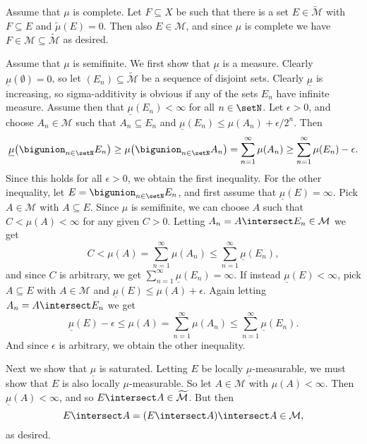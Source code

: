 \documentclass[article, a4paper, 11pt, oneside]{memoir}
\numberwithin{equation}{chapter}
\newcommand{\calM}{\mathcal{M}}
\begin{document}
\begin{solution}
	\item Assume that $\mu$ is complete. Let $F \subseteq X$ be such that there is a set $E \in \widetilde{\calM}$ with $F \subseteq E$ and $\tilde\mu(E) = 0$. Then also $E \in \calM$, and since $\mu$ is complete we have $F \in \calM \subseteq \widetilde{\calM}$ as desired.

	\item Assume that $\mu$ is semifinite. We first show that $\underline\mu$ is a measure. Clearly $\underline\mu(\emptyset) = 0$, so let $(E_n) \subseteq \widetilde{\calM}$ be a sequence of disjoint sets. Clearly $\underline\mu$ is increasing, so sigma-additivity is obvious if any of the sets $E_n$ have infinite measure. Assume then that $\underline\mu(E_n) < \infty$ for all $n \in \setN$. Let $\epsilon > 0$, and choose $A_n \in \calM$ such that $A_n \subseteq E_n$ and $\underline\mu(E_n) \leq \mu(A_n) + \epsilon/2^n$. Then
	\begin{equation*}
		\underline\mu \bigl( \bigunion_{n \in \setN} E_n \bigr)
			\geq \mu \bigl( \bigunion_{n \in \setN} A_n \bigr)
			= \sum_{n=1}^\infty \mu(A_n)
			\geq \sum_{n=1}^\infty \mu(E_n) - \epsilon.
	\end{equation*}
	Since this holds for all $\epsilon > 0$, we obtain the first inequality. For the other inequality, let $E = \bigunion_{n \in \setN} E_n$, and first assume that $\underline\mu(E) = \infty$. Pick $A \in \calM$ with $A \subseteq E$. Since $\mu$ is semifinite, we can choose $A$ such that $C < \mu(A) < \infty$ for any given $C > 0$. Letting $A_n = A \intersect E_n \in \calM$ we get
	\begin{equation*}
		C
			< \mu(A)
			= \sum_{n=1}^\infty \mu(A_n)
			\leq \sum_{n=1}^\infty \underline\mu(E_n),
	\end{equation*}
	and since $C$ is arbitrary, we get $\sum_{n=1}^\infty \underline\mu(E_n) = \infty$. If instead $\underline\mu(E) < \infty$, pick $A \subseteq E$ with $A \in \calM$ and $\underline\mu(E) \leq \mu(A) + \epsilon$. Again letting $A_n = A \intersect E_n$ we get
	\begin{equation*}
		\underline\mu(E) - \epsilon
			\leq \mu(A)
			= \sum_{n=1}^\infty \mu(A_n)
			\leq \sum_{n=1}^\infty \underline\mu(E_n).
	\end{equation*}
	And since $\epsilon$ is arbitrary, we obtain the other inequality.

	Next we show that $\underline\mu$ is saturated. Letting $E$ be locally $\underline\mu$-measurable, we must show that $E$ is also locally $\mu$-measurable. So let $A \in \calM$ with $\mu(A) < \infty$. Then $\underline\mu(A) < \infty$, and so $E \intersect A \in \widetilde{\calM}$. But then
	\begin{equation*}
		E \intersect A
			= (E \intersect A) \intersect A
			\in \calM,
	\end{equation*}
	as desired.


\end{solution}
\end{document}
